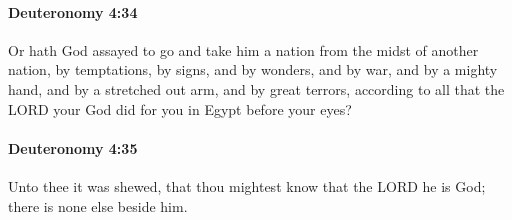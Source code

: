 		\paragraph{Deuteronomy 4:34} %
			\label{DEUTERONOMY-4-34}

			Or hath God assayed to go and take him a nation from the midst of another nation, by temptations, by signs, and by wonders, and by war, and by a mighty hand, and by a stretched out arm, and by great terrors, according to all that the LORD your God did for you in Egypt before your eyes?


		\paragraph{Deuteronomy 4:35} %
			\label{DEUTERONOMY-4-35}

			Unto thee it was shewed, that thou mightest know that the LORD he is God; there is none else beside him.

